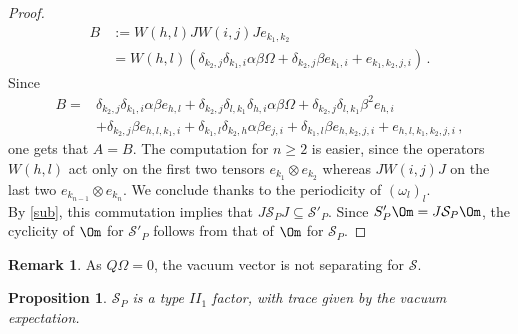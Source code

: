 \documentclass[12pt]{amsart}
\numberwithin{equation}{section}
\def\a{\alpha}
\def\b{\beta}
\newtheorem{prop}[thm]{Proposition}
\theoremstyle{definition}
\newtheorem{rem}[thm]{Remark}
\begin{document}
\begin{proof}
\begin{align*}
B&:=W(h,l)JW(i,j)Je_{k_1,k_2}\\
&=  W(h,l)
    (\delta_{k_2,j}\delta_{k_1,i}\a\b \Omega +
    \delta_{k_2,j}\b e_{k_1,i}+e_{k_1,k_2,j,i})\,.
\end{align*}
Since
\begin{align*}
B=&\delta_{k_2,j}\delta_{k_1,i}\a\b e_{h,l}+
\delta_{k_2,j}\delta_{l,k_1}\delta_{h,i}\a\b\Omega+
       \delta_{k_2,j} \delta_{l,k_1}\b^2e_{h,i}\\
       &+\delta_{k_2,j}\b e_{h,l,k_1,i}+
\delta_{k_1,l}\delta_{k_2,h}\a\b e_{j,i}+\delta_{k_1,l}
       \b e_{h,k_2,j,i}+ e_{h,l,k_1,k_2,j,i}\,,
\end{align*}
one gets that $A=B$.
   The computation for $n\geq 2$ is easier, since the operators
   $W(h,l)$ act only on the first two tensors $e_{k_1}\otimes e_{k_2}$ whereas
$JW(i,j)J$ on the last two $e_{k_{n-1}}\otimes e_{k_n}$. We conclude thanks to the periodicity of $(\omega_l)_l$.\\
By \eqref{sub}, this commutation implies that $J\mathcal{S}_PJ\subseteq \mathcal{S}'_P$. Since ${S}'_P\Om=J\mathcal{S}_P\Om$, the cyclicity of $\Om$ for $\mathcal{S}'_P$ follows from that of $\Om$ for $\mathcal{S}_P$.
\end{proof}
\begin{rem} As $Q \Omega=0$, the vacuum vector is not separating for $\mathcal S$.
\end{rem}
\begin{prop}\label{evenfactor}
$\mathcal{S}_P$ is a type $II_1$ factor, with trace given by the vacuum expectation.
\end{prop}
\end{document}
